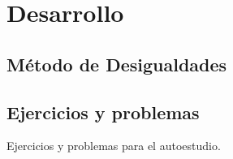 \section{Desarrollo}

\subsection{Método de Desigualdades}


\subsection{Ejercicios y problemas}

Ejercicios y problemas para el autoestudio.
